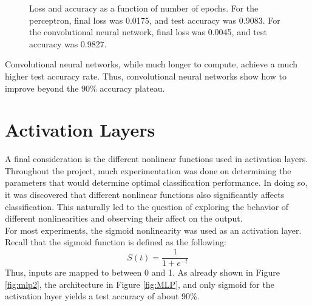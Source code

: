 \documentclass{article}
\begin{document}
\begin{figure}[H]
    \centering
    \caption{Loss and accuracy as a function of number of epochs. For the perceptron, final loss was 0.0175, and test accuracy was 0.9083. For the convolutional neural network, final loss was 0.0045, and test accuracy was 0.9827.}
\end{figure}
Convolutional neural networks, while much longer to compute, achieve a much higher test accuracy rate. Thus, convolutional neural networks show how to improve beyond the 90\% accuracy plateau.


\section{Activation Layers}

A final consideration is the different nonlinear functions used in activation layers. Throughout the project, much experimentation was done on determining the parameters that would determine optimal classification performance. In doing so, it was discovered that different nonlinear functions also significantly affects classification. This naturally led to the question of exploring the behavior of different nonlinearities and observing their affect on the output. \\
For most experiments, the sigmoid nonlinearity was used as an activation layer. Recall that the sigmoid function is defined as the following:
\[
        S(t) = \frac{1}{1 + e^{-t}}
\]
Thus, inputs are mapped to between 0 and 1. As already shown in Figure \ref{fig:mlp2}, the architecture in Figure \ref{fig:MLP}, and only sigmoid for the activation layer yields a test accuracy of about 90\%.\\
\end{document}
